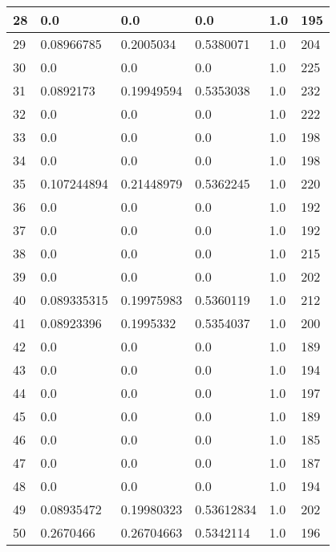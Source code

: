 \begin{longtable}{|l|l|l|l|l|l|}
28 & 0.0 & 0.0 & 0.0 & 1.0 & 195 \\ \hline 
29 & 0.08966785 & 0.2005034 & 0.5380071 & 1.0 & 204 \\ \hline 
30 & 0.0 & 0.0 & 0.0 & 1.0 & 225 \\ \hline 
31 & 0.0892173 & 0.19949594 & 0.5353038 & 1.0 & 232 \\ \hline 
32 & 0.0 & 0.0 & 0.0 & 1.0 & 222 \\ \hline 
33 & 0.0 & 0.0 & 0.0 & 1.0 & 198 \\ \hline 
34 & 0.0 & 0.0 & 0.0 & 1.0 & 198 \\ \hline 
35 & 0.107244894 & 0.21448979 & 0.5362245 & 1.0 & 220 \\ \hline 
36 & 0.0 & 0.0 & 0.0 & 1.0 & 192 \\ \hline 
37 & 0.0 & 0.0 & 0.0 & 1.0 & 192 \\ \hline 
38 & 0.0 & 0.0 & 0.0 & 1.0 & 215 \\ \hline 
39 & 0.0 & 0.0 & 0.0 & 1.0 & 202 \\ \hline 
40 & 0.089335315 & 0.19975983 & 0.5360119 & 1.0 & 212 \\ \hline 
41 & 0.08923396 & 0.1995332 & 0.5354037 & 1.0 & 200 \\ \hline 
42 & 0.0 & 0.0 & 0.0 & 1.0 & 189 \\ \hline 
43 & 0.0 & 0.0 & 0.0 & 1.0 & 194 \\ \hline 
44 & 0.0 & 0.0 & 0.0 & 1.0 & 197 \\ \hline 
45 & 0.0 & 0.0 & 0.0 & 1.0 & 189 \\ \hline 
46 & 0.0 & 0.0 & 0.0 & 1.0 & 185 \\ \hline 
47 & 0.0 & 0.0 & 0.0 & 1.0 & 187 \\ \hline 
48 & 0.0 & 0.0 & 0.0 & 1.0 & 194 \\ \hline 
49 & 0.08935472 & 0.19980323 & 0.53612834 & 1.0 & 202 \\ \hline 
50 & 0.2670466 & 0.26704663 & 0.5342114 & 1.0 & 196 \\ \hline 
\end{longtable}